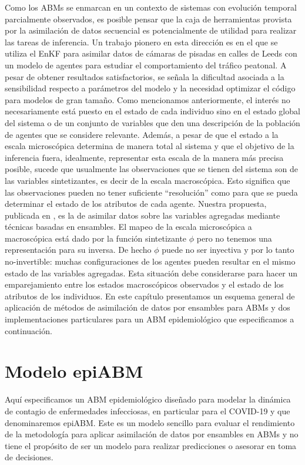 Como los ABMs se enmarcan en un contexto de sistemas con evolución temporal parcialmente observados, es posible pensar que la caja de herramientas provista por la asimilación de datos secuencial es potencialmente de utilidad para realizar las tareas de inferencia. Un trabajo pionero en esta dirección es \cite{Ward2016} en el que se utiliza el EnKF para asimilar datos de cámaras de pisadas en calles de Leeds con un modelo de agentes para estudiar el comportamiento del tráfico peatonal. A pesar de obtener resultados satisfactorios, se señala la dificultad asociada a la sensibilidad respecto a parámetros del modelo y la necesidad optimizar el código para modelos de gran tamaño. Como mencionamos anteriormente, el interés no necesariamente está puesto en el estado de cada individuo sino en el estado global del sistema o de un conjunto de variables que den una descripción de la población de agentes que se considere relevante. Además, a pesar de que el estado a la escala microscópica determina de manera total al sistema y que el objetivo de la inferencia fuera, idealmente, representar esta escala de la manera más precisa posible, sucede que usualmente las observaciones que se tienen del sistema son de las variables sintetizantes, es decir de la escala macroscópica. Esto significa que las observaciones pueden no tener suficiente ``resolución'' como para que se pueda determinar el estado de los atributos de cada agente. Nuestra propuesta, publicada en \cite{Cocucci2022}, es la de asimilar datos sobre las variables agregadas mediante técnicas basadas en ensambles. El mapeo de la escala microscópica a macroscópica está dado por la función sintetizante $\phi$ pero no tenemos una representación para su inversa. De hecho $\phi$ puede no ser inyectiva y por lo tanto no-invertible: muchas configuraciones de los agentes pueden resultar en el mismo estado de las variables agregadas. Esta situación debe considerarse para hacer un emparejamiento entre los estados macroscópicos observados y el estado de los atributos de los individuos. En este capítulo presentamos un esquema general de aplicación de métodos de asimilación de datos por ensambles para ABMs y dos implementaciones particulares para un ABM epidemiológico que especificamos a continuación.

\section{Modelo epiABM} \label{sec:epi_abm}

Aquí especificamos un ABM epidemiológico diseñado para modelar la dinámica de contagio de enfermedades infecciosas, en particular para el COVID-19 y que denominaremos epiABM. Este es un modelo sencillo para evaluar el rendimiento de la metodología para aplicar asimilación de datos por ensambles en ABMs y no tiene el propósito de ser un modelo para realizar predicciones o asesorar en toma de decisiones.

